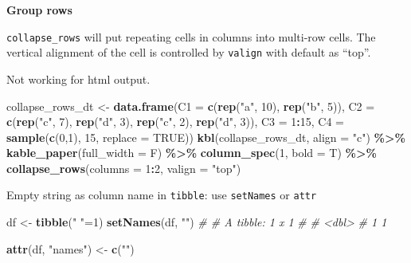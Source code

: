\documentclass[
  a4paper,
  twoside,
  openright]{book}
\newenvironment{Shaded}{\begin{snugshade}}{\end{snugshade}}
\newcommand{\AttributeTok}[1]{\textcolor[rgb]{0.13,0.29,0.53}{#1}}
\newcommand{\CommentTok}[1]{\textcolor[rgb]{0.56,0.35,0.01}{\textit{#1}}}
\newcommand{\ConstantTok}[1]{\textcolor[rgb]{0.56,0.35,0.01}{#1}}
\newcommand{\DecValTok}[1]{\textcolor[rgb]{0.00,0.00,0.81}{#1}}
\newcommand{\FunctionTok}[1]{\textcolor[rgb]{0.13,0.29,0.53}{\textbf{#1}}}
\newcommand{\NormalTok}[1]{#1}
\newcommand{\OtherTok}[1]{\textcolor[rgb]{0.56,0.35,0.01}{#1}}
\newcommand{\SpecialCharTok}[1]{\textcolor[rgb]{0.81,0.36,0.00}{\textbf{#1}}}
\newcommand{\StringTok}[1]{\textcolor[rgb]{0.31,0.60,0.02}{#1}}
\theoremstyle{definition}
\theoremstyle{definition}
\theoremstyle{definition}
\theoremstyle{definition}
\theoremstyle{remark}
\begin{document}
\textbf{Group rows}

\texttt{collapse\_rows} will put repeating cells in columns into multi-row cells. The vertical alignment of the cell is controlled by \texttt{valign} with default as ``top''.

Not working for html output.

\begin{Shaded}
\begin{Highlighting}[]
\NormalTok{collapse\_rows\_dt }\OtherTok{\textless{}{-}} \FunctionTok{data.frame}\NormalTok{(}\AttributeTok{C1 =} \FunctionTok{c}\NormalTok{(}\FunctionTok{rep}\NormalTok{(}\StringTok{"a"}\NormalTok{, }\DecValTok{10}\NormalTok{), }\FunctionTok{rep}\NormalTok{(}\StringTok{"b"}\NormalTok{, }\DecValTok{5}\NormalTok{)),}
                 \AttributeTok{C2 =} \FunctionTok{c}\NormalTok{(}\FunctionTok{rep}\NormalTok{(}\StringTok{"c"}\NormalTok{, }\DecValTok{7}\NormalTok{), }\FunctionTok{rep}\NormalTok{(}\StringTok{"d"}\NormalTok{, }\DecValTok{3}\NormalTok{), }\FunctionTok{rep}\NormalTok{(}\StringTok{"c"}\NormalTok{, }\DecValTok{2}\NormalTok{), }\FunctionTok{rep}\NormalTok{(}\StringTok{"d"}\NormalTok{, }\DecValTok{3}\NormalTok{)),}
                 \AttributeTok{C3 =} \DecValTok{1}\SpecialCharTok{:}\DecValTok{15}\NormalTok{,}
                 \AttributeTok{C4 =} \FunctionTok{sample}\NormalTok{(}\FunctionTok{c}\NormalTok{(}\DecValTok{0}\NormalTok{,}\DecValTok{1}\NormalTok{), }\DecValTok{15}\NormalTok{, }\AttributeTok{replace =} \ConstantTok{TRUE}\NormalTok{))}
\FunctionTok{kbl}\NormalTok{(collapse\_rows\_dt, }\AttributeTok{align =} \StringTok{"c"}\NormalTok{) }\SpecialCharTok{\%\textgreater{}\%}
  \FunctionTok{kable\_paper}\NormalTok{(}\AttributeTok{full\_width =}\NormalTok{ F) }\SpecialCharTok{\%\textgreater{}\%}
  \FunctionTok{column\_spec}\NormalTok{(}\DecValTok{1}\NormalTok{, }\AttributeTok{bold =}\NormalTok{ T) }\SpecialCharTok{\%\textgreater{}\%}
  \FunctionTok{collapse\_rows}\NormalTok{(}\AttributeTok{columns =} \DecValTok{1}\SpecialCharTok{:}\DecValTok{2}\NormalTok{, }\AttributeTok{valign =} \StringTok{"top"}\NormalTok{)}
\end{Highlighting}
\end{Shaded}

Empty string as column name in \texttt{tibble}: use \texttt{setNames} or \texttt{attr}

\begin{Shaded}
\begin{Highlighting}[]
\NormalTok{df }\OtherTok{\textless{}{-}} \FunctionTok{tibble}\NormalTok{(}\StringTok{" "}\OtherTok{=}\DecValTok{1}\NormalTok{)}
\FunctionTok{setNames}\NormalTok{(df, }\StringTok{""}\NormalTok{)}
\CommentTok{\# \# A tibble: 1 x 1}
\CommentTok{\#      \textasciigrave{}\textasciigrave{}}
\CommentTok{\#   \textless{}dbl\textgreater{}}
\CommentTok{\# 1     1}

\FunctionTok{attr}\NormalTok{(df, }\StringTok{"names"}\NormalTok{) }\OtherTok{\textless{}{-}} \FunctionTok{c}\NormalTok{(}\StringTok{""}\NormalTok{)}
\end{Highlighting}
\end{Shaded}
\end{document}
